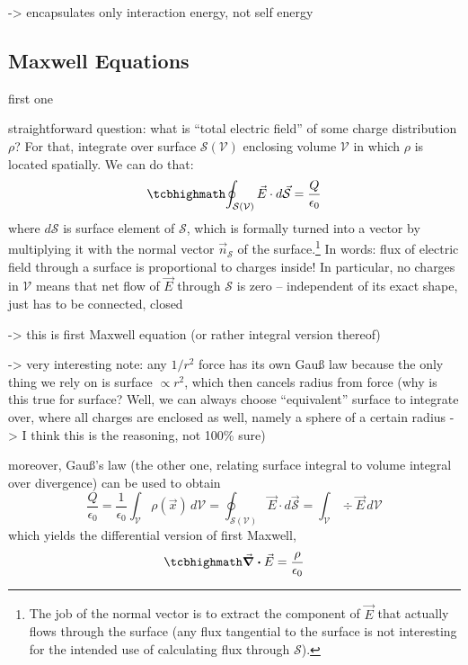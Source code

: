 \documentclass[../class_mech_main.tex]{subfiles}
\begin{document}
-> encapsulates only interaction energy, not self energy 



        \subsection{Maxwell Equations}

first one


straightforward question: what is \enquote{total electric field} of some charge distribution $\rho$? For that, integrate over surface $\mathcal{S}(\mathcal{V})$ enclosing volume $\mathcal{V}$ in which $\rho$ is located spatially. We can do that:
\begin{equation}\label{eq:gauss_law_integral}
    \eqbox{
        \oint_{\mathcal{S}(\mathcal{V})} \vec{E} \cdot d\vec{\mathcal{S}} = \frac{Q}{\epsilon_0}
    }
\end{equation}
where $d\mathcal{S}$ is surface element of $\mathcal{S}$, which is formally turned into a vector by multiplying it with the normal vector $\vec{n}_\mathcal{S}$ of the surface.\footnote{The job of the normal vector is to extract the component of $\vec{E}$ that actually flows through the surface (any flux tangential to the surface is not interesting for the intended use of calculating flux through $\mathcal{S}$).} In words: flux of electric field through a surface is proportional to charges inside! In particular, no charges in $\mathcal{V}$ means that net flow of $\vec{E}$ through $\mathcal{S}$ is zero -- independent of its exact shape, just has to be connected, closed


-> this is first Maxwell equation (or rather integral version thereof)

-> very interesting note: any $1/r^2$ force has its own Gauß law because the only thing we rely on is surface $\propto r^2$, which then cancels radius from force (why is this true for surface? Well, we can always choose \enquote{equivalent} surface to integrate over, where all charges are enclosed as well, namely a sphere of a certain radius -> I think this is the reasoning, not 100\% sure)

moreover, Gauß's law (the other one, relating surface integral to volume integral over divergence) can be used to obtain
\begin{equation*}
    \frac{Q}{\epsilon_0} = \frac{1}{\epsilon_0}\int_\mathcal{V} \rho(\vec{x}) \, d\mathcal{V} = \oint_{\mathcal{S}(\mathcal{V})} \vec{E} \cdot d\vec{\mathcal{S}} = \int_\mathcal{V} \div \vec{E} \, d\mathcal{V}
\end{equation*}
which yields the differential version of first Maxwell,
\begin{equation}\label{eq:gauss_law_differential}
    \eqbox{
        \div \vec{E} = \frac{\rho}{\epsilon_0}
    }
\end{equation}
\end{document}
